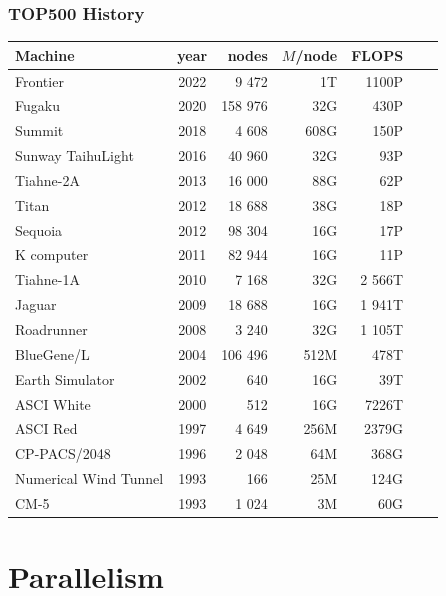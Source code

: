 \documentclass[xcolor={x11names,svgnames,psnames}]{beamer}
\begin{document}

\begin{frame}
  \frametitle{TOP500 History}

  \small
  \begin{tabular}{|l||c|r|r|r|r|r|}
  \hline
  Machine             & year & nodes   & $M$/node & FLOPS \\
  \hline\hline
Frontier              & 2022 &   9 472  & 1T       &  1100P  \\
Fugaku                & 2020 & 158 976	& 32G	   &   430P  \\
Summit                & 2018 &   4 608	& 608G	   &   150P  \\
Sunway TaihuLight     & 2016 &  40 960	& 32G	   &    93P  \\
Tiahne-2A             & 2013 &  16 000	& 88G	   &    62P  \\
Titan                 & 2012 &  18 688	& 38G	   &    18P  \\
Sequoia	              & 2012 &  98 304	& 16G	   &    17P  \\
K computer            & 2011 &  82 944	& 16G	   &    11P  \\
Tiahne-1A             & 2010 &   7 168	& 32G	   & 2 566T  \\
Jaguar                & 2009 &  18 688	& 16G	   & 1 941T  \\
Roadrunner            & 2008 &   3 240	& 32G	   & 1 105T  \\
BlueGene/L            & 2004 & 106 496	& 512M	   &   478T  \\
Earth Simulator       &	2002 &     640	& 16G	   &    39T  \\
ASCI White            &	2000 &     512	& 16G	   &  7226T  \\
ASCI Red              &	1997 &   4 649	& 256M	   &  2379G  \\
CP-PACS/2048          &	1996 &   2 048	& 64M	   &   368G  \\
Numerical Wind Tunnel &	1993 &     166	& 25M	   &   124G  \\
CM-5                  &	1993 &   1 024	& 3M	   &    60G  \\
\hline
\end{tabular}

\end{frame}



\section{Parallelism}
\end{document}
